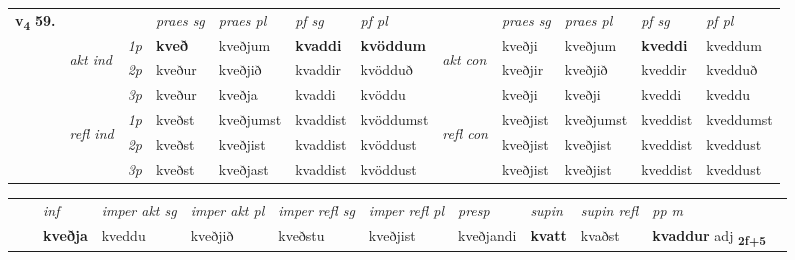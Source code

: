 \begin{tabular}{llllllllllll} \toprule
\multirow{4}{*}{{{\textbf{v{\textsubscript{4}}} \Large{\textbf{59.}}}}}  & &   &  \textit{praes sg}  & \textit{praes pl}  &\textit{ pf sg} & \textit{pf pl} &  &  \textit{praes sg}  & \textit{praes pl}  & \textit{pf sg} & \textit{pf pl } \\*
	\cmidrule{4-7} \cmidrule{9-12}
 & \multirow{3}{*}{\begin{turn}{90}\textit{akt ind}\end{turn}} & {\textit{1p}} & \textbf{kveð} & kveðjum    & \textbf{kvaddi} & \textbf{kvöddum} & \multirow{3}{*}{\begin{turn}{90}\textit{akt con}\end{turn}} &kveðji & kveðjum & \textbf{kveddi} & kveddum\\*
& &  {\textit{2p}} &  kveður  & kveðjið   & kvaddir & kvödduð & & kveðjir & kveðjið & kveddir & kvedduð \\*
& &  {\textit{3p}} & kveður & kveðja   & kvaddi & kvöddu & & kveðji & kveðji& kveddi & kveddu  \\*
\cmidrule{4-7} \cmidrule{9-12}
 &\multirow{3}{*}{\begin{turn}{90}\textit{refl ind}\end{turn}} & {\textit{1p}} & kveðst & kveðjumst    & kvaddist & kvöddumst & \multirow{3}{*}{\begin{turn}{90}\textit{refl con}\end{turn}}  &kveðjist & kveðjumst & kveddist & kveddumst\\*
 &&  {\textit{2p}} &  kveðst  & kveðjist   & kvaddist & kvöddust & &kveðjist & kveðjist & kveddist & kveddust \\*
& &  {\textit{3p}} & kveðst & kveðjast   & kvaddist & kvöddust & & kveðjist & kveðjist& kveddist & kveddust  \\*
\cmidrule{4-7} \cmidrule{9-12}
\end{tabular}


\begin{tabular}{llllllllllll}
 & & \textit{inf} & \textit{imper akt sg} & \textit{imper akt pl} & \textit{imper refl sg} & \textit{imper refl pl} & \textit{presp} & \textit{supin} & \textit{supin refl} & \textit{pp m}     \\*
  & & \textbf{kveðja} & kveddu  & kveðjið & kveðstu & kveðjist & kveðjandi &  \textbf{kvatt} & kvaðst & \textbf{kvaddur} adj \textbf{\textsubscript{2f+5}} \\*
\cmidrule{1-12}
\end{tabular}



